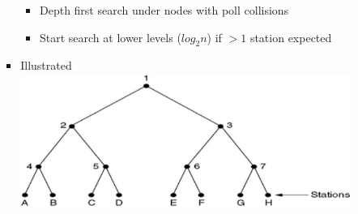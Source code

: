 \documentclass[a4paper,10pt]{article}
\begin{document}
\begin{enumerate}
\begin{enumerate}
\begin{enumerate}
\begin{itemize}
                \begin{itemize}
                  \item Depth first search under nodes with poll collisions
                  \item Start search at lower levels ($log_2 n$) if $>1$ station expected
                \end{itemize}
              \item Illustrated
                \newline\includegraphics[width=\textwidth]{adaptivetree}
            \end{itemize}
        \end{enumerate}
    \end{enumerate}
    

\end{enumerate}
\end{document}
